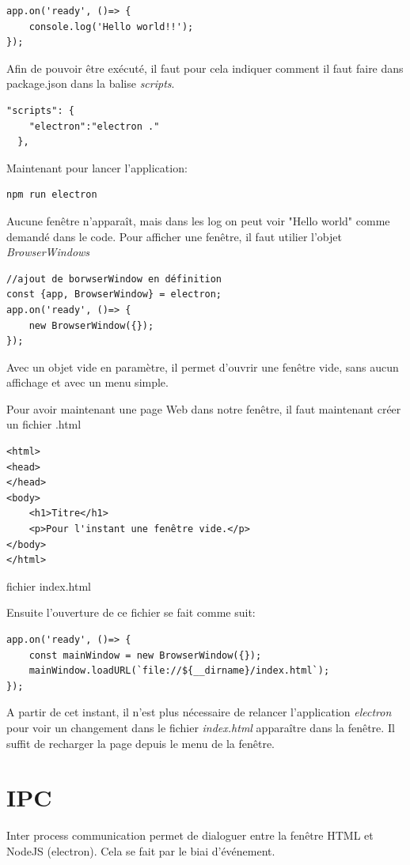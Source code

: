 \documentclass[12pt,oneside]{scrbook}
\begin{document}
\begin{verbatim}
app.on('ready', ()=> {
    console.log('Hello world!!');
});
\end{verbatim}
Afin de pouvoir être exécuté, il faut pour cela indiquer comment il faut faire dans package.json dans la balise \textit{scripts}.
\begin{verbatim}
"scripts": {
    "electron":"electron ."
  },
\end{verbatim}
Maintenant pour lancer l'application:
\begin{verbatim}
npm run electron
\end{verbatim}
Aucune fenêtre n'apparaît, mais dans les log on peut voir "Hello world" comme demandé dans le code. 
Pour afficher une fenêtre, il faut utilier l'objet \textit{BrowserWindows}
\begin{verbatim}
//ajout de borwserWindow en définition
const {app, BrowserWindow} = electron;
app.on('ready', ()=> {
    new BrowserWindow({});
});
\end{verbatim}
Avec un objet vide en paramètre, il permet d'ouvrir une fenêtre vide, sans aucun affichage et avec un menu simple.

Pour avoir maintenant une page Web dans notre fenêtre, il faut maintenant créer un fichier .html
\begin{listing}[ht]
\begin{verbatim}
<html>
<head>
</head>
<body>
    <h1>Titre</h1>
    <p>Pour l'instant une fenêtre vide.</p>
</body>
</html>
\end{verbatim}
\caption{fichier index.html}
\label{listing:0}
\end{listing}
Ensuite l'ouverture de ce fichier se fait comme suit:
\begin{verbatim}
app.on('ready', ()=> {
    const mainWindow = new BrowserWindow({});
    mainWindow.loadURL(`file://${__dirname}/index.html`);
});
\end{verbatim}
A partir de cet instant, il n'est plus nécessaire de relancer l'application \textit{electron} pour voir un changement dans le fichier \textit{index.html} apparaître dans la fenêtre. Il suffit de recharger la page depuis le menu de la fenêtre.

\chapter{IPC}
Inter process communication permet de dialoguer entre la fenêtre HTML et NodeJS (electron). Cela se fait par le biai d'événement.
\end{document}
